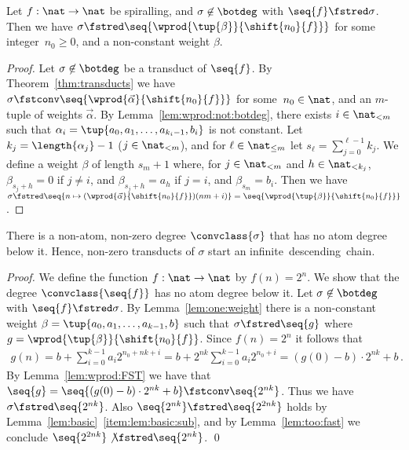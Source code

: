 \begin{lemma}\label{lem:one:weight}
  Let $f : \nat \to \nat$ be spiralling, and $\sigma \not\in \botdeg$ with $\seq{f} \fstred \sigma$.
  Then we have $\sigma \fstred \seq{\wprod{\tup{\beta}}{\shift{n_0}{f}}}$
  for some integer~$n_0 \ge 0$, and a non-constant weight $\beta$.
\end{lemma}
\begin{proof}Let $\sigma \not\in \botdeg$ be a transduct of $\seq{f}$. 
  By Theorem~\ref{thm:transducts} we have
  $\sigma \fstconv \seq{\wprod{\vec{\alpha}}{\shift{n_0}{f}}}$
  for some~$n_0 \in \nat$, and an $m$-tuple of weights $\vec{\alpha}$.
  By Lemma~\ref{lem:wprod:not:botdeg}, there exists $i \in \nat_{<m}$ 
  such that $\alpha_i = \tup{a_0,a_1,\ldots,a_{k_i-1},b_i}$ is not constant.
Let $k_j = \length{\alpha_j}-1$ ($j \in \nat_{<m}$), 
  and for $\ell \in \nat_{\le m}$ let $s_\ell = \sum_{j=0}^{\ell - 1} k_j$.
  We define a weight $\beta$ of length $s_m + 1$ where, for $j \in \nat_{<m}$ and $h \in \nat_{<k_j}$,
  $\beta_{s_j + h} = 0$ if $j \ne i$, and $\beta_{s_j + h} = a_h$ if $j = i$, 
  and $\beta_{s_m} = b_i$.
  Then we have
  $\sigma \fstred \seq{n \mapsto (\wprod{\vec{\alpha}}{\shift{n_0}{f}})(nm + i)} = \seq{\wprod{\tup{\beta}}{\shift{n_0}{f}}}$.
\end{proof}

\begin{theorem}\label{thm:no:minimal:below}
  There is a non-atom, non-zero degree $\convclass{\sigma}$ that has no atom degree below it.
  Hence, non-zero transducts of $\sigma$ start an infinite~descending~chain. \end{theorem}

\begin{proof}
  We define the function $f : \nat \to \nat$ by $f(n) = 2^n$.
  We show that the degree $\convclass{\seq{f}}$ has no atom degree below it.
  Let $\sigma\not\in\botdeg$ with $\seq{f} \fstred \sigma$. 
  By Lemma~\ref{lem:one:weight} there is a non-constant weight $\beta = \tup{a_0,a_1,\ldots,a_{k-1},b}$
  such that $\sigma \fstred \seq{g}$ where 
  $g = \wprod{\tup{\beta}}{\shift{n_0}{f}}$.
Since $f(n) = 2^n$ it follows that 
  \begin{align*}
    g(n) = b+\sum_{i =0}^{k-1} a_i 2^{n_0+nk+i} = b + 2^{nk}\sum_{i =0}^{k-1} a_i 2^{n_0 +i} =  (g(0)-b) \cdot 2^{nk} + b \,.
  \end{align*}
  By Lemma~\ref{lem:wprod:FST} we have that $\seq{g} = \seq{(g(0)-b) \cdot 2^{nk} + b} \fstconv \seq{2^{nk}}$.
  Thus we have $\sigma \fstred \seq{2^{nk}}$.
  Also $\seq{2^{nk}} \fstred \seq{2^{2nk}}$
  holds by Lemma~\ref{lem:basic}~\ref{item:lem:basic:sub},
  and by Lemma~\ref{lem:too:fast} we conclude $\seq{2^{2nk}} \not\fstred \seq{2^{nk}}$.
  \qed
\end{proof}
